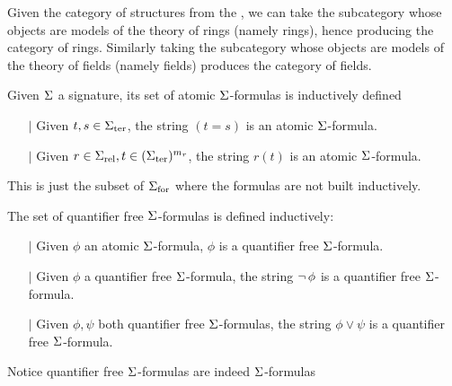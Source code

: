 \begin{eg}
    Given the category of structures from the 
    , 
    we can take the subcategory whose objects are models 
    of the theory of rings (namely rings), 
    hence producing the category of rings.
    Similarly taking the subcategory whose objects are models of the 
    theory of fields (namely fields) produces the category of fields.
\end{eg}

\begin{dfn}
    Given $\Sigma$ a signature, 
    its set of atomic $\Sigma$-formulas is inductively defined
    \begin{itemize}
        \item[$\vert$] Given $t, s \in {\Sigma}_\mathrm{ter}$, 
        the string $(t = s)$ is an atomic $\Sigma$-formula.
        \item[$\vert$] Given $r \in {\Sigma}_\mathrm{rel}, t \in ({\Sigma}_\mathrm{ter})^{m_r}$, 
        the string $r(t)$ is an atomic $\Sigma$-formula.
    \end{itemize}
    This is just the subset of ${\Sigma}_\mathrm{for}$ 
    where the formulas are not built inductively.
\end{dfn}

\begin{dfn}
    The set of quantifier free $\Sigma$-formulas is defined inductively:
    \begin{itemize}
        \item[$\vert$] Given $\phi$ an atomic $\Sigma$-formula,
            $\phi$ is a quantifier free $\Sigma$-formula.
        \item[$\vert$] Given $\phi$ a quantifier free $\Sigma$-formula, 
        the string $\neg\, \phi$ is a quantifier free $\Sigma$-formula. 
        \item[$\vert$] Given $\phi, \psi$ both quantifier free $\Sigma$-formulas, 
        the string $\phi \lor \psi$ is a quantifier free $\Sigma$-formula.
    \end{itemize}
    Notice quantifier free $\Sigma$-formulas are indeed $\Sigma$-formulas
\end{dfn}

